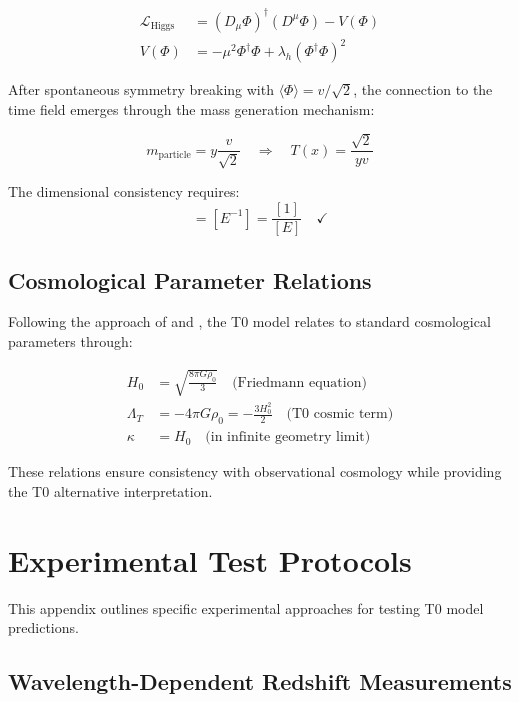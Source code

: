 \documentclass[12pt,a4paper]{article}
\begin{document}
	\begin{align}
		\mathcal{L}_{\text{Higgs}} &= (D_\mu \Phi)^\dagger (D^\mu \Phi) - V(\Phi) \\
		V(\Phi) &= -\mu^2 \Phi^\dagger \Phi + \lambda_h (\Phi^\dagger \Phi)^2
	\end{align}
	
	After spontaneous symmetry breaking with $\langle\Phi\rangle = v/\sqrt{2}$, the connection to the time field emerges through the mass generation mechanism:
	
	\begin{equation}
		m_{\text{particle}} = y \frac{v}{\sqrt{2}} \quad \Rightarrow \quad T(x) = \frac{\sqrt{2}}{y v}
	\end{equation}
	
	The dimensional consistency requires:
	\begin{equation}
		[T(x)] = [E^{-1}] = \frac{[1]}{[E]} \quad \checkmark
	\end{equation}
	
	\subsection{Cosmological Parameter Relations}
	\label{app:cosmological_parameters}
	
	Following the approach of \citet{weinberg2008} and \citet{peebles1993}, the T0 model relates to standard cosmological parameters through:
	
	\begin{align}
		H_0 &= \sqrt{\frac{8\pi G \rho_0}{3}} \quad \text{(Friedmann equation)} \\
		\Lambda_T &= -4\pi G \rho_0 = -\frac{3 H_0^2}{2} \quad \text{(T0 cosmic term)} \\
		\kappa &= H_0 \quad \text{(in infinite geometry limit)}
	\end{align}
	
	These relations ensure consistency with observational cosmology while providing the T0 alternative interpretation.
	
	\section{Experimental Test Protocols}
	\label{app:experimental_protocols}
	
	This appendix outlines specific experimental approaches for testing T0 model predictions.
	
	\subsection{Wavelength-Dependent Redshift Measurements}
	\label{app:redshift_measurements}
	
\end{document}
